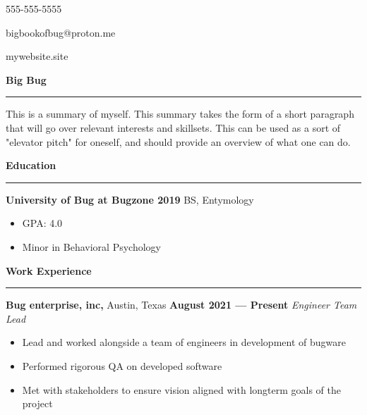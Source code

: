 \documentclass[a4paper, 12pt]{article}
\begin{document}
\begin{flushright}
{\fontsize{12pt}{12pt}\selectfont
\item 555-555-5555
\item bigbookofbug@proton.me
\item mywebsite.site
}\end{flushright}
\vspace{-40pt}
\begin{flushleft}
{\fontsize{16pt}{16pt}\selectfont
{\textbf{Big Bug}}}
\noindent\rule{\textwidth}{0.4pt}
\end{flushleft}
\begin{flushleft}
{\fontsize{12pt}{12pt}\selectfont
This is a summary of myself. This summary takes the form of a short paragraph that will go over relevant interests and skillsets. This can be used as a sort of "elevator pitch" for oneself, and should provide an overview of what one can do.}
\newline
\end{flushleft}
\begin{flushleft}
{\fontsize{12pt}{12pt}\selectfont
\textbf{Education}}
\noindent\rule{\textwidth}{0.4pt}
\end{flushleft}
\begin{flushleft}
{\textbf{University of Bug at Bugzone \hfill 2019}}
\newline
BS, Entymology\begin{multicols}{2}
\begin{itemize}
\item GPA: 4.0
\item Minor in Behavioral Psychology
\end{itemize}
\end{multicols}
\end{flushleft}
\begin{flushleft}
{\fontsize{12pt}{12pt}\selectfont \textbf{Work Experience}}
\noindent\rule{\textwidth}{0.4pt}
\end{flushleft}
\begin{flushleft}
{\textbf{Bug enterprise, inc,} Austin, Texas \hfill 
\textbf{August 2021 --- Present}}
\newline
\textit{Engineer Team Lead}
\begin{itemize}
\item Lead and worked alongside a team of engineers in development of bugware
\item Performed rigorous QA on developed software
\item Met with stakeholders to ensure vision aligned with longterm goals of the project
\end{itemize}
\end{flushleft}
\end{document}
